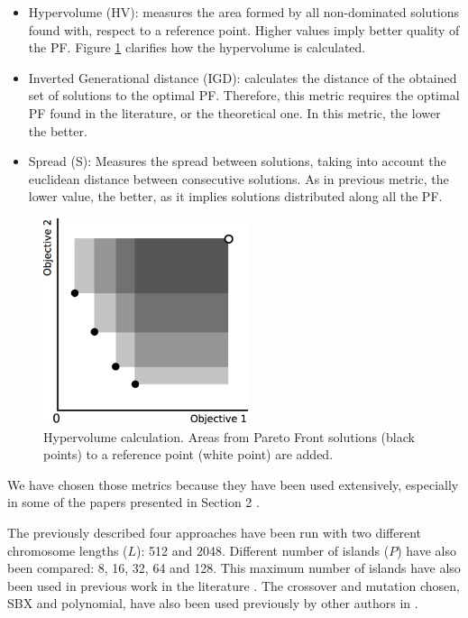 \documentclass[preprint]{elsarticle}
\begin{document}
\begin{itemize}
\item Hypervolume (HV): measures the area formed by all non-dominated solutions found with, respect to a reference point. Higher values imply better quality of the PF. Figure \ref{fig:hypervolume} clarifies how the hypervolume is calculated.
\item Inverted Generational distance (IGD): calculates the distance of the obtained set of solutions to the optimal PF. Therefore, this metric requires the optimal PF found in the literature, or the theoretical one. In this metric, the lower the better. %
\item Spread (S): Measures the spread between solutions, taking into account the euclidean distance between consecutive solutions. As in previous metric, the lower value, the better, as it implies solutions distributed along all the PF.
\end{itemize}

\begin{figure}
\centering
\includegraphics[width=6cm]{hypervolume.jpg}
\caption{Hypervolume calculation. Areas from Pareto Front solutions (black points) to a reference point (white point) are added.}
\label{fig:hypervolume}
\end{figure}


We have chosen those metrics because they have been used extensively, especially in some of the papers presented in Section 2 \cite{Dorronsoro13superlinear,Durillo08masterslave,Hiroyasu07discussion,Wang09parallel,Martens13asynchronous}.



The previously described four approaches have been run with two
different chromosome lengths ($L$): 512 and 2048. Different number of
islands ($P$) have also been compared: 8, 16, 32, 64 and 128. This
maximum number of islands have also been  used in previous work in the
literature \citep{Martens13asynchronous}. The crossover and mutation
chosen, SBX and polynomial, have also been  used previously by other
authors in \citep{Durillo08masterslave}.  %
\end{document}

